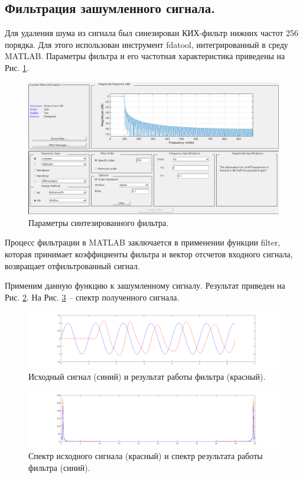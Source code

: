 \documentclass[a4paper,14pt]{extarticle}
\begin{document}
\subsection{Фильтрация зашумленного сигнала.}
Для удаления шума из сигнала был синезирован КИХ-фильтр нижних частот 256 порядка. Для этого использован инструмент fdatool, интегрированный в среду MATLAB. Параметры фильтра и его частотная характеристика приведены на Рис. \ref{params}.

\begin{figure}[H]
\centering
\includegraphics[scale=0.38]{pics/3filter_params.png}
\caption{Параметры синтезированного фильтра.}
\label{params}
\end{figure}

Процесс фильтрации в MATLAB заключается в применении функции filter, которая принимает коэффициенты фильтра и вектор отсчетов входного сигнала, возвращает  отфильтрованный сигнал.

Применим данную функцию к зашумленному сигналу. Результат приведен на Рис. \ref{filtered_1}. На Рис. \ref{filtered_1_spec} -- спектр полученного сигнала.

\begin{figure}[H]
\centering
\includegraphics[scale=0.38]{pics/3filtered_3.png}
\caption{Исходный сигнал (синий) и результат работы фильтра (красный).}
\label{filtered_1}
\end{figure}

\begin{figure}[H]
\centering
\includegraphics[scale=0.38]{pics/3filtered_3_spec.png} 
\caption{Спектр исходного сигнала (красный) и спектр результата работы фильтра (синий).}
\label{filtered_1_spec}
\end{figure}
\end{document}
